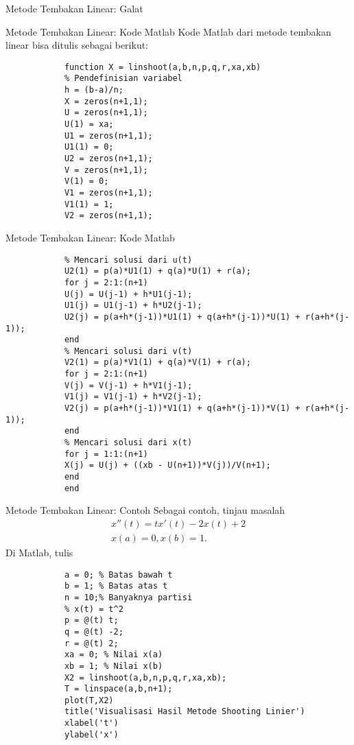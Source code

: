 \documentclass[xcolor={dvipsnames}, 9pt]{beamer}
\begin{document}
    \begin{frame}{Metode Tembakan Linear: Galat}
        
    \end{frame}
    \begin{frame}[fragile]{Metode Tembakan Linear: Kode Matlab}
    	Kode Matlab dari metode tembakan linear bisa ditulis sebagai berikut:
		\begin{verbatim}
			function X = linshoot(a,b,n,p,q,r,xa,xb)
			% Pendefinisian variabel
			h = (b-a)/n;
			X = zeros(n+1,1);
			U = zeros(n+1,1);
			U(1) = xa;
			U1 = zeros(n+1,1);
			U1(1) = 0;
			U2 = zeros(n+1,1);
			V = zeros(n+1,1);
			V(1) = 0;
			V1 = zeros(n+1,1);
			V1(1) = 1;
			V2 = zeros(n+1,1);
		\end{verbatim}
	\end{frame}
	\begin{frame}[fragile]{Metode Tembakan Linear: Kode Matlab}
		\begin{verbatim}
			% Mencari solusi dari u(t)
			U2(1) = p(a)*U1(1) + q(a)*U(1) + r(a);
			for j = 2:1:(n+1)
			U(j) = U(j-1) + h*U1(j-1);
			U1(j) = U1(j-1) + h*U2(j-1);
			U2(j) = p(a+h*(j-1))*U1(1) + q(a+h*(j-1))*U(1) + r(a+h*(j-1));
			end
			% Mencari solusi dari v(t)
			V2(1) = p(a)*V1(1) + q(a)*V(1) + r(a);
			for j = 2:1:(n+1)
			V(j) = V(j-1) + h*V1(j-1);
			V1(j) = V1(j-1) + h*V2(j-1);
			V2(j) = p(a+h*(j-1))*V1(1) + q(a+h*(j-1))*V(1) + r(a+h*(j-1));
			end
			% Mencari solusi dari x(t)
			for j = 1:1:(n+1)
			X(j) = U(j) + ((xb - U(n+1))*V(j))/V(n+1);
			end
			end
		\end{verbatim}
	\end{frame}
    \begin{frame}[fragile]{Metode Tembakan Linear: Contoh}
    	Sebagai contoh, tinjau masalah
    	\begin{align*}
    		x''(t) = tx'(t) - 2x(t) + 2 \\
    		x(a) = 0, x(b) = 1.
    	\end{align*}
    	Di Matlab, tulis
    	\begin{verbatim}
    		a = 0; % Batas bawah t
    		b = 1; % Batas atas t
    		n = 10;% Banyaknya partisi
    		% x(t) = t^2
    		p = @(t) t;
    		q = @(t) -2;
    		r = @(t) 2;
    		xa = 0; % Nilai x(a)
    		xb = 1; % Nilai x(b)
    		X2 = linshoot(a,b,n,p,q,r,xa,xb);
    		T = linspace(a,b,n+1);
    		plot(T,X2)
    		title('Visualisasi Hasil Metode Shooting Linier')
    		xlabel('t')
    		ylabel('x')
    	\end{verbatim}
    \end{frame}
\end{document}
